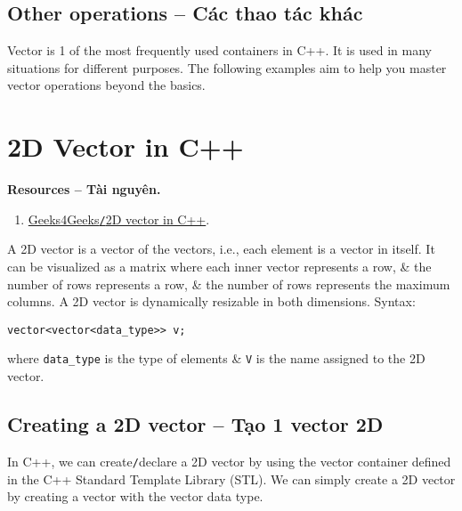 \documentclass{article}
\begin{document}

\subsection{Other operations -- Các thao tác khác}
Vector is 1 of the most frequently used containers in C++. It is used in many situations for different purposes. The following examples aim to help you master vector operations beyond the basics.


\section{2D Vector in C++}
\textbf{\textsf{Resources -- Tài nguyên.}}
\begin{enumerate}
	\item \href{https://www.geeksforgeeks.org/2d-vector-in-cpp-with-user-defined-size/}{Geeks4Geeks{\tt/}2D vector in C++}.
\end{enumerate}
A 2D vector is a vector of the vectors, i.e., each element is a vector in itself. It can be visualized as a matrix where each inner vector represents a row, \& the number of rows represents a row, \& the number of rows represents the maximum columns. A 2D vector is dynamically resizable in both dimensions. Syntax:
\begin{verbatim}
vector<vector<data_type>> v;
\end{verbatim}
where \verb|data_type| is the type of elements \& {\tt V} is the name assigned to the 2D vector.


\subsection{Creating a 2D vector -- Tạo 1 vector 2D}
In C++, we can create{\tt/}declare a 2D vector by using the vector container defined in the C++ Standard Template Library (STL). We can simply create a 2D vector by creating a vector with the vector data type.
\end{document}
